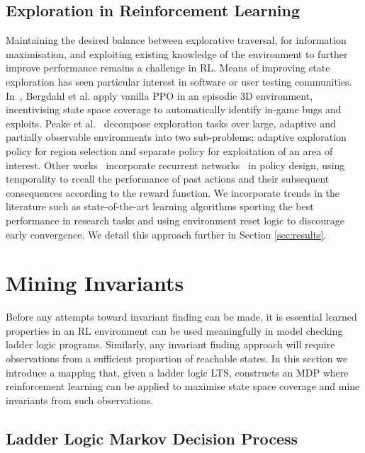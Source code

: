 \documentclass[runningheads]{llncs}
\begin{document}
\subsection{Exploration in Reinforcement Learning} 
Maintaining the desired balance between explorative traversal, for information maximisation, and exploiting existing knowledge of the environment to further improve performance remains a challenge in RL. Means of improving state exploration has seen particular interest in software or user testing communities. In~\cite{9231552}, Bergdahl et al. apply vanilla PPO in an episodic 3D environment, incentivising state space coverage to automatically identify in-game bugs and exploits. Peake et al.~\cite{9476756} decompose exploration tasks over large, adaptive and partially observable environments into two sub-problems; adaptive exploration policy for region selection and separate policy for exploitation of an area of interest. Other works~\cite{s21041067} incorporate recurrent networks~\cite{medsker2001recurrent} in policy design, using temporality to recall the performance of past actions and their subsequent consequences according to the reward function. We incorporate trends in the literature such as state-of-the-art learning algorithms sporting the best performance in research tasks and using environment reset logic to discourage early convergence. We detail this approach further in Section \ref{sec:results}.


\section{Mining Invariants} \label{sec:mapping_fm_to_ml}
Before any attempts toward invariant finding can be made, it is essential learned properties in an RL environment can be used meaningfully in model checking ladder logic programs. Similarly, any invariant finding approach will require observations from a sufficient proportion of reachable states. In this section we introduce a mapping that, given a ladder logic LTS, constructs an MDP where reinforcement learning can be applied to maximise state space coverage and mine invariants from such observations.

\subsection{Ladder Logic Markov Decision Process}\label{subsect:MDP} 
\end{document}
